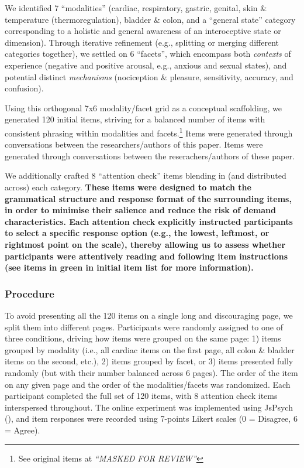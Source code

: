 \documentclass[
  man,
  floatsintext,
  longtable,
  nolmodern,
  notxfonts,
  notimes,
  mask,
  colorlinks=true,linkcolor=blue,citecolor=blue,urlcolor=blue]{apa7}
\begin{document}
We identified 7 ``modalities'' (cardiac, respiratory, gastric, genital,
skin \& temperature (thermoregulation), bladder \& colon, and a
``general state'' category corresponding to a holistic and general
awareness of an interoceptive state or dimension). Through iterative
refinement (e.g., splitting or merging different categories together),
we settled on 6 ``facets'', which encompass both \emph{contexts} of
experience (negative and positive arousal, e.g., anxious and sexual
states), and potential distinct \emph{mechanisms} (nociception \&
pleasure, sensitivity, accuracy, and confusion).

Using this orthogonal 7x6 modality/facet grid as a conceptual
scaffolding, we generated 120 initial items, striving for a balanced
number of items with consistent phrasing within modalities and
facets.\footnote{See original items at \emph{``MASKED FOR REVIEW''}}
Items were generated through conversations between the
researchers/authors of this paper. Items were generated through
conversations between the reserachers/authors of these paper.

We additionally crafted 8 ``attention check'' items blending in (and
distributed across) each category. \textbf{These items were designed to
match the grammatical structure and response format of the surrounding
items, in order to minimise their salience and reduce the risk of demand
characteristics. Each attention check explicitly instructed participants
to select a specific response option (e.g., the lowest, leftmost, or
rightmost point on the scale), thereby allowing us to assess whether
participants were attentively reading and following item instructions
(see items in green in initial item list for more information).}

\subsubsection{Procedure}\label{procedure}

To avoid presenting all the 120 items on a single long and discouraging
page, we split them into different pages. Participants were randomly
assigned to one of three conditions, driving how items were grouped on
the same page: 1) items grouped by modality (i.e., all cardiac items on
the first page, all colon \& bladder items on the second, etc.), 2)
items grouped by facet, or 3) items presented fully randomly (but with
their number balanced across 6 pages). The order of the item on any
given page and the order of the modalities/facets was randomized. Each
participant completed the full set of 120 items, with 8 attention check
items interspersed throughout. The online experiment was implemented
using JsPsych (), and item
responses were recorded using 7-points Likert scales (0 = Disagree, 6 =
Agree).
\end{document}
